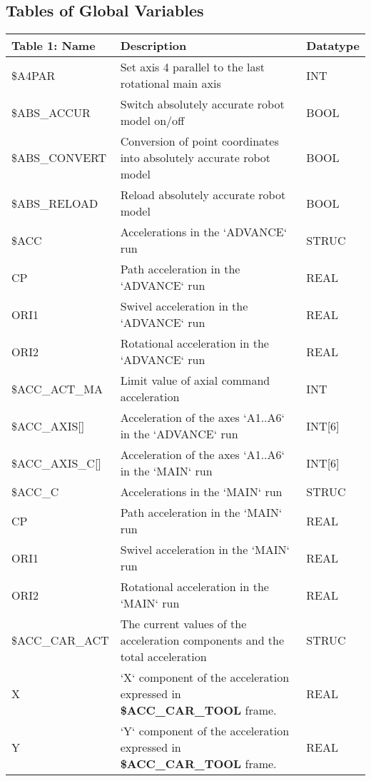 \begin{appendices}
    \section{Tables of Global Variables}
    \begin{tabular}{|p{}|p{}|p{}|}
        \hline
        \textbf{Table 1: Name} & \textbf{Description} & \textbf{Datatype} \\ \hline
        \$A4PAR & Set axis 4 parallel to the last rotational main axis & INT \\ \hline
        \$ABS\_ACCUR & Switch absolutely accurate robot model on/off & BOOL \\ \hline
        \$ABS\_CONVERT & Conversion of point coordinates into absolutely accurate robot model & BOOL \\ \hline
        \$ABS\_RELOAD & Reload absolutely accurate robot model & BOOL \\ \hline
        \$ACC & Accelerations in the `ADVANCE` run & STRUC \\ \hline
        \quad CP & Path acceleration in the `ADVANCE` run & REAL \\ \hline
        \quad ORI1 & Swivel acceleration in the `ADVANCE` run & REAL \\ \hline
        \quad ORI2 & Rotational acceleration in the `ADVANCE` run & REAL \\ \hline
        \$ACC\_ACT\_MA & Limit value of axial command acceleration & INT \\ \hline
        \$ACC\_AXIS[] & Acceleration of the axes `A1..A6` in the `ADVANCE` run & INT[6] \\ \hline
        \$ACC\_AXIS\_C[] & Acceleration of the axes `A1..A6` in the `MAIN` run & INT[6] \\ \hline
        \$ACC\_C & Accelerations in the `MAIN` run & STRUC \\ \hline
        \quad CP & Path acceleration in the `MAIN` run & REAL \\ \hline
        \quad ORI1 & Swivel acceleration in the `MAIN` run & REAL \\ \hline
        \quad ORI2 & Rotational acceleration in the `MAIN` run & REAL \\ \hline
        \$ACC\_CAR\_ACT & The current values of the acceleration components and the total acceleration & STRUC \\ \hline
        \quad X & `X` component of the acceleration expressed in \textbf{\$ACC\_CAR\_TOOL} frame. & REAL \\ \hline
        \quad Y & `Y` component of the acceleration expressed in \textbf{\$ACC\_CAR\_TOOL} frame. & REAL \\ \hline
        \end{tabular}
        

\end{appendices}
